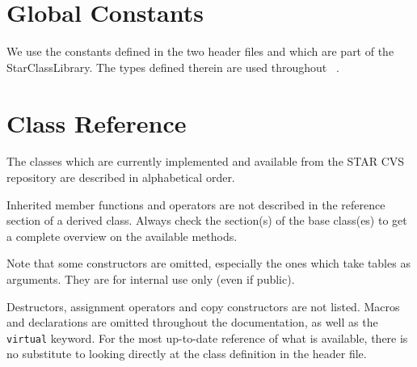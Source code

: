 
\section{Global Constants}

We use the constants defined in the two header files
  and
 which are part of the StarClassLibrary.
The types defined therein are used
throughout \StMcEvent\ .




\section{Class Reference}
The classes which are currently implemented and available from the
STAR CVS repository are described in alphabetical order.

Inherited member functions and operators are not described in the
reference section of a derived class. Always check the section(s)
of the base class(es) to get a complete overview on the available
methods.

Note that some constructors are omitted, especially the ones which
take tables as arguments. They are for internal use only (even if
public).

Destructors, assignment operators and copy constructors are not
listed.  Macros and  declarations are omitted throughout the
documentation, as well as the {\tt virtual} keyword.  For the
most up-to-date reference of what is available, there is no
substitute to looking directly at the class definition in
the header file.

\clearpage


%
%
